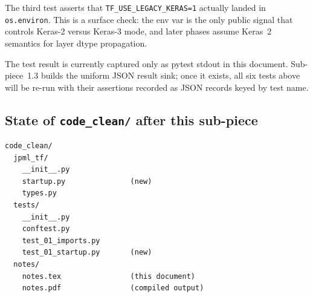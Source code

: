 \documentclass[11pt]{report}
\begin{document}
The third test asserts that \texttt{TF\_USE\_LEGACY\_KERAS=1} actually
landed in \texttt{os.environ}. This is a surface check: the env var is
the only public signal that controls Keras-2 versus Keras-3 mode, and
later phases assume Keras~2 semantics for layer dtype propagation.

The test result is currently captured only as pytest stdout in this
document. Sub-piece~1.3 builds the uniform JSON result sink; once it
exists, all six tests above will be re-run with their assertions
recorded as JSON records keyed by test name.

\subsection*{State of \texttt{code\_clean/} after this sub-piece}

\begin{lstlisting}[style=shell]
code_clean/
  jpml_tf/
    __init__.py
    startup.py               (new)
    types.py
  tests/
    __init__.py
    conftest.py
    test_01_imports.py
    test_01_startup.py       (new)
  notes/
    notes.tex                (this document)
    notes.pdf                (compiled output)
\end{lstlisting}
\end{document}
